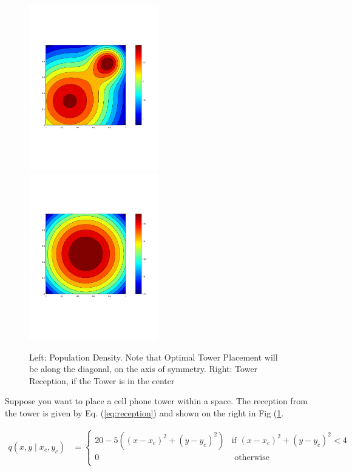 \documentclass{article}
\begin{document}
\begin{figure}[h!]
\includegraphics[width=0.5\textwidth]{population.png}
\includegraphics[width=0.5\textwidth]{quality.png}
\caption{Left: Population Density.  Note that Optimal Tower Placement 
	will be along the diagonal, on the axis of symmetry.
Right: Tower Reception, if the Tower is in the center}
\label{fig:pop-density}
\end{figure}

Suppose you want to place a cell phone tower within a space.
The reception from the tower is given by Eq. (\ref{eq:reception}) and
	shown on the right in Fig (\ref{fig:pop-density}.

\begin{align}
q(x,y \mid x_c,y_c) & = \begin{cases}
	20 - 5 ((x-x_c)^2 + (y-y_c)^2) & \text{if $(x-x_c)^2 + (y-y_c)^2 < 4$} \\
	0 & \text{ otherwise} \\ \end{cases} \label{eq:reception}
\end{align}
\end{document}
